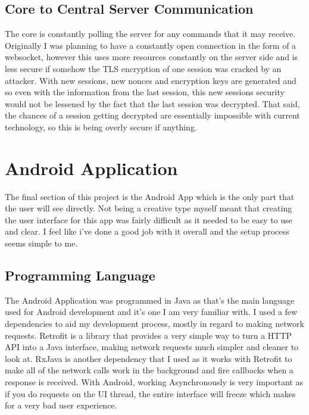\subsection{Core to Central Server Communication}
The core is constantly polling the server for any commands that it may receive. Originally I was planning to have a constantly open connection in the form of a websocket, however this uses more resources constantly on the server side and is less secure if somehow the TLS encryption of one session was cracked by an attacker. With new sessions, new nonces and encryption keys are generated and so even with the information from the last session, this new sessions security would not be lessened by the fact that the last session was decrypted. That said, the chances of a session getting decrypted are essentially impossible with current technology, so this is being overly secure if anything.

\section{Android Application}
The final section of this project is the Android App which is the only part that the user will see directly. Not being a creative type myself meant that creating the user interface for this app was fairly difficult as it needed to be easy to use and clear. I feel like i've done a good job with it overall and the setup process seems simple to me.

\subsection{Programming Language}
The Android Application was programmed in Java as that's the main language used for Android development and it's one I am very familiar with. I used a few dependencies to aid my development process, mostly in regard to making network requests. Retrofit is a library that provides a very simple way to turn a HTTP API into a Java interface, making network requests much simpler and cleaner to look at. RxJava is another dependency that I used as it works with Retrofit to make all of the network calls work in the background and fire callbacks when a response is received. With Android, working Asynchronously is very important as if you do requests on the UI thread, the entire interface will freeze which makes for a very bad user experience.

